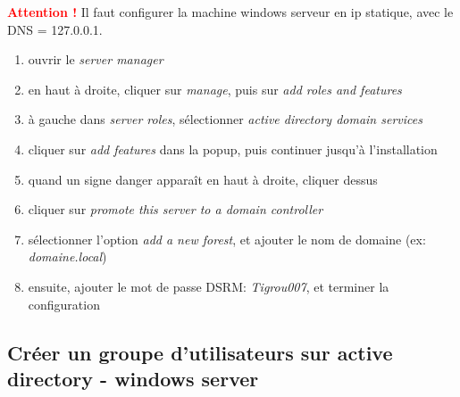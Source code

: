 \documentclass[a4paper]{article}
\begin{document}
\textcolor{red}{\textbf{Attention !}} Il faut configurer la machine windows serveur en ip statique, avec le DNS = 127.0.0.1.
\begin{enumerate}
    \item ouvrir le \textit{server manager}
    \item en haut à droite, cliquer sur \textit{manage}, puis sur \textit{add roles and features}
    \item à gauche dans \textit{server roles}, sélectionner \textit{active directory domain services}
    \item cliquer sur \textit{add features} dans la popup, puis continuer jusqu'à l'installation
    \item quand un signe danger apparaît en haut à droite, cliquer dessus
    \item cliquer sur \textit{promote this server to a domain controller}
    \item sélectionner l'option \textit{add a new forest}, et ajouter le nom de domaine (ex: \textit{domaine.local})
    \item ensuite, ajouter le mot de passe DSRM: \textit{Tigrou007}, et terminer la configuration
\end{enumerate}










\subsection{Créer un groupe d'utilisateurs sur active directory - windows server}
\end{document}
